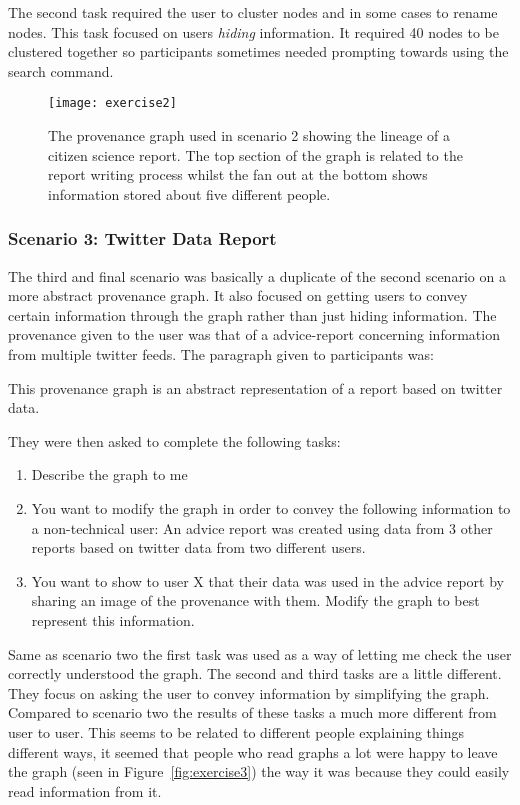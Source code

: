 The second task required the user to cluster nodes and in some cases to rename nodes. This task focused on users \textit{hiding} information. It required 40 nodes to be clustered together so participants sometimes needed prompting towards using the search command. 

\begin{figure}[h]
	\centering
	\texttt{[image: exercise2]}
	\caption{The provenance graph used in scenario 2 showing the lineage of a citizen science report. The top section of the graph is related to the report writing process whilst the fan out  at the bottom shows information stored about five different people.}
	\label{fig:exercise2}
\end{figure}


\subsubsection{Scenario 3: Twitter Data Report}
\label{ssub:Scenario 3: Twitter Data Report}

The third and final scenario was basically a duplicate of the second scenario on a more abstract provenance graph. It also focused on getting users to convey certain information through the graph rather than just hiding information. The provenance given to the user was that of a advice-report concerning information from multiple twitter feeds. The paragraph given to participants was: 

\begin{framed}
This provenance graph is an abstract representation of a report based on twitter data. 
\end{framed}

They were then asked to complete the following tasks:

\begin{enumerate}[label=\arabic*.]
	\item Describe the graph to me
	\item You want to modify the graph in order to convey the following information to a non-technical user: An advice report was created using data from 3 other reports based on twitter data from two different users. 
	\item You want to show to user X that their data was used in the advice report by sharing an image of the provenance with them. Modify the graph to best represent this information. 
\end{enumerate}

Same as scenario two the first task was used as a way of letting me check the user correctly understood the graph. The second and third tasks are a little different. They focus on asking the user to convey information by simplifying the graph. Compared to scenario two the results of these tasks a much more different from user to user. This seems to be related to different people explaining things different ways, it seemed that people who read graphs a lot were happy to leave the graph (seen in Figure~\ref{fig:exercise3}) the way it was because they could easily read information from it. 

